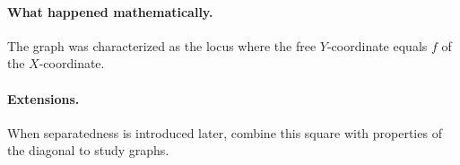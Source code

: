 \paragraph{What happened mathematically.}
The graph was characterized as the locus where the free $Y$-coordinate equals $f$ of the $X$-coordinate.

\paragraph{Extensions.}
When separatedness is introduced later, combine this square with properties of the diagonal to study graphs.
\fi
